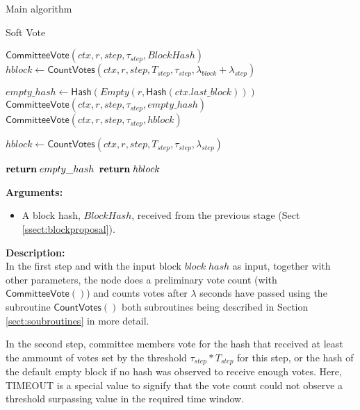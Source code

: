 \documentclass[10pt,a4paper]{article}
\begin{document}
\begin{section}{Main algorithm}
\begin{subsection}{Soft Vote}
\begin{algorithm}[H]
\begin{algorithmic}[H]
    \State $\mathsf{CommitteeVote}(ctx, r, step, \tau_{step}, BlockHash)$
    \State $hblock \gets \mathsf{CountVotes}(ctx, r, step, T_{step}, \tau_{step}, \lambda_{block} + \lambda_{step})$

    \State $empty\_hash \gets \mathsf{Hash}(Empty(r, \mathsf{Hash}(ctx.last\_block)))$ 
        \State $\mathsf{CommitteeVote}(ctx, r, step, \tau_{step}, empty\_hash)$
    \Else
        {\State $\mathsf{CommitteeVote}(ctx, r, step, \tau_{step}, hblock)$}
    \EndIf\

    \State $hblock \gets \mathsf{CountVotes}(ctx, r, step, T_{step}, \tau_{step}, \lambda_{step})$ 

        {$\Return\; empty\_hash$}
        {$\Return\; hblock$}
    \EndFunction
    \end{algorithmic}
    \caption{\underline{Soft Vote}}
\end{algorithm}

\noindent \textbf{Arguments:}
\begin{itemize}
    \item A block hash, $BlockHash$, received from the previous stage (Sect \ref{ssect:blockproposal}).
  \end{itemize}

\noindent \textbf{Description:}\\
In the first step and with the input block $block\; hash$ as input, together
with other parameters, the node does a preliminary vote count (with $\mathsf{CommitteeVote}()$) and counts votes 
after $\lambda$ seconds have passed using the subroutine $\mathsf{CountVotes}()$ \-both 
subroutines being described in Section \ref{sect:soubroutines} in more detail.

In the second step, committee members vote for the hash that received at least the 
ammount of votes set by the threshold $\tau_{step} * T_{step}$ for this step, or the hash of the default empty
block if no hash was observed to receive enough votes. Here, TIMEOUT is a special value to signify that the vote count
could not observe a threshold surpassing value in the required time window.



\end{subsection}
\end{section}
\end{document}
